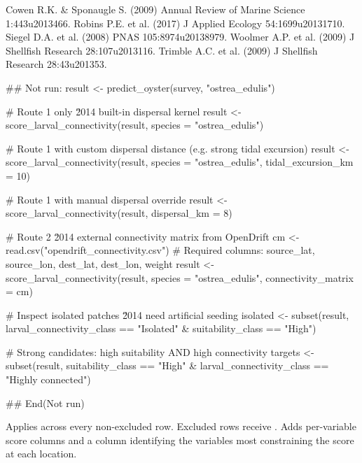 \documentclass[a4paper]{book}
\begin{document}
%
\begin{References}
Cowen R.K. \& Sponaugle S. (2009) Annual Review of Marine Science 1:443\bsl{}u2013466.
Robins P.E. et al. (2017) J Applied Ecology 54:1699\bsl{}u20131710. 
Siegel D.A. et al. (2008) PNAS 105:8974\bsl{}u20138979.
Woolmer A.P. et al. (2009) J Shellfish Research 28:107\bsl{}u2013116.
Trimble A.C. et al. (2009) J Shellfish Research 28:43\bsl{}u201353.
\end{References}
%
\begin{Examples}
\begin{ExampleCode}
## Not run: 
result <- predict_oyster(survey, "ostrea_edulis")

# Route 1 only \u2014 built-in dispersal kernel
result <- score_larval_connectivity(result, species = "ostrea_edulis")

# Route 1 with custom dispersal distance (e.g. strong tidal excursion)
result <- score_larval_connectivity(result, species = "ostrea_edulis",
                                    tidal_excursion_km = 10)

# Route 1 with manual dispersal override
result <- score_larval_connectivity(result, dispersal_km = 8)

# Route 2 \u2014 external connectivity matrix from OpenDrift
cm <- read.csv("opendrift_connectivity.csv")
# Required columns: source_lat, source_lon, dest_lat, dest_lon, weight
result <- score_larval_connectivity(result,
           species             = "ostrea_edulis",
           connectivity_matrix = cm)

# Inspect isolated patches \u2014 need artificial seeding
isolated <- subset(result,
  larval_connectivity_class == "Isolated" & suitability_class == "High")

# Strong candidates: high suitability AND high connectivity
targets <- subset(result,
  suitability_class == "High" & larval_connectivity_class == "Highly connected")

## End(Not run)
\end{ExampleCode}
\end{Examples}
%
\begin{Description}
Applies  across every non-excluded row. Excluded rows
receive . Adds per-variable score columns and a
 column identifying the variables most constraining
the score at each location.
\end{Description}
\end{document}
